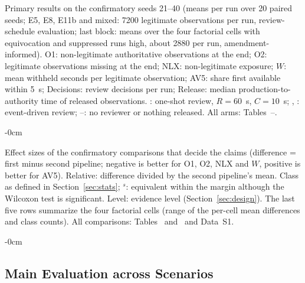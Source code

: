 \begin{table}[!htbp]
\caption{Primary results on the confirmatory seeds 21--40 (means per run over 20 paired seeds; E5, E8, E11b and mixed: 7200 legitimate observations per run, review-schedule evaluation; last block: means over the four factorial cells with equivocation and suppressed runs high, about 2880 per run, amendment-informed). O1: non-legitimate authoritative observations at the end; O2: legitimate observations missing at the end; NLX: non-legitimate exposure; $W$: mean withheld seconds per legitimate observation; AV5: share first available within 5~s; Decisions: review decisions per run; Release: median production-to-authority time of released observations. \Bhist: one-shot review, $R=60$~s, $C=10$~s; \Bev, \Rev: event-driven review; --: no reviewer or nothing released. All arms: Tables~--.\label{tab:primary}}
\begin{adjustwidth}{-\extralength}{0cm}
\centering
\footnotesize

\end{adjustwidth}
\end{table}

\begin{table}[!htbp]
\caption{Effect sizes of the confirmatory comparisons that decide the claims (difference = first minus second pipeline; negative is better for O1, O2, NLX and $W$, positive is better for AV5). Relative: difference divided by the second pipeline's mean. Class as defined in Section~\ref{sec:stats}; $^{s}$: equivalent within the margin although the Wilcoxon test is significant. Level: evidence level (Section~\ref{sec:design}). The last five rows summarize the four factorial cells (range of the per-cell mean differences and class counts). All comparisons: Tables~ and~ and Data~S1.\label{tab:effects}}
\begin{adjustwidth}{-\extralength}{0cm}
\centering
\footnotesize

\end{adjustwidth}
\end{table}

\subsection{Main Evaluation across Scenarios}\label{sec:res-main}

